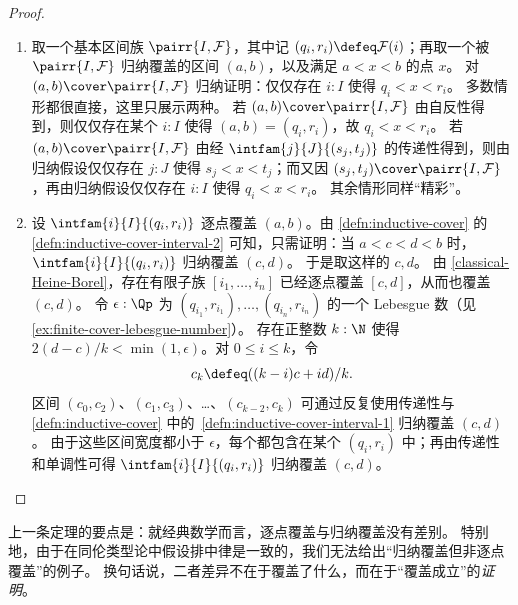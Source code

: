 \begin{proof}
  \mbox{}
  \begin{enumerate}

  \item
    取一个基本区间族 $\pairr{I, \mathcal{F}}$，其中记 $(q_i,
    r_i) \defeq \mathcal{F}(i)$；再取一个被 $\pairr{I,
      \mathcal{F}}$ 归纳覆盖的区间 $(a,b)$，以及满足 $a < x < b$ 的点 $x$。
    对 $(a,b) \cover \pairr{I, \mathcal{F}}$ 归纳证明：仅仅存在 $i : I$ 使得 $q_i < x < r_i$。
    多数情形都很直接，这里只展示两种。
    若 $(a,b) \cover \pairr{I, \mathcal{F}}$ 由自反性得到，则仅仅存在某个 $i : I$ 使得 $(a,b) = (q_i, r_i)$，故 $q_i < x < r_i$。
    若 $(a,b)
    \cover \pairr{I, \mathcal{F}}$ 由经 $\intfam{j}{J}{(s_j, t_j)}$ 的传递性得到，则由归纳假设仅仅存在 $j : J$ 使得 $s_j < x < t_j$；而又因 $(s_j, t_j) \cover \pairr{I, \mathcal{F}}$，再由归纳假设仅仅存在
    $i : I$ 使得 $q_i < x < r_i$。
    其余情形同样“精彩”。

  \item 设 $\intfam{i}{I}{(q_i, r_i)}$ 逐点覆盖 $(a, b)$。由
    \cref{defn:inductive-cover} 的 \cref{defn:inductive-cover-interval-2}
    可知，只需证明：当 $a < c < d < b$ 时，$\intfam{i}{I}{(q_i, r_i)}$ 归纳覆盖 $(c, d)$。
    于是取这样的 $c,d$。
    由 \cref{classical-Heine-Borel}，存在有限子族 $[i_1, \ldots, i_n]$ 已经逐点覆盖 $[c,
    d]$，从而也覆盖 $(c,d)$。
    令 $\epsilon : \Qp$ 为
    $(q_{i_1}, r_{i_1}), \ldots, (q_{i_n}, r_{i_n})$ 的一个 Lebesgue 数（见
    \cref{ex:finite-cover-lebesgue-number}）。
    存在正整数 $k : \N$ 使得 $2 (d - c)/k
    < \min(1, \epsilon)$。对 $0 \leq i \leq k$，令
    \begin{equation*}
      c_k \defeq ((k - i) c + i d) / k.
    \end{equation*}
    区间 $(c_0, c_2)$、$(c_1, c_3)$、\dots、$(c_{k-2}, c_k)$ 可通过反复使用传递性与
    \cref{defn:inductive-cover} 中的~\cref{defn:inductive-cover-interval-1}
    归纳覆盖 $(c,d)$。
    由于这些区间宽度都小于 $\epsilon$，每个都包含在某个 $(q_i, r_i)$ 中；再由传递性和单调性可得
    $\intfam{i}{I}{(q_i, r_i)}$ 归纳覆盖 $(c, d)$。\qedhere
  \end{enumerate}
\end{proof}

上一条定理的要点是：就经典数学而言，逐点覆盖与归纳覆盖没有差别。
特别地，由于在同伦类型论中假设排中律是一致的，我们无法给出“归纳覆盖但非逐点覆盖”的例子。
换句话说，二者差异不在于覆盖了什么，而在于“覆盖成立”的\emph{证明}。

